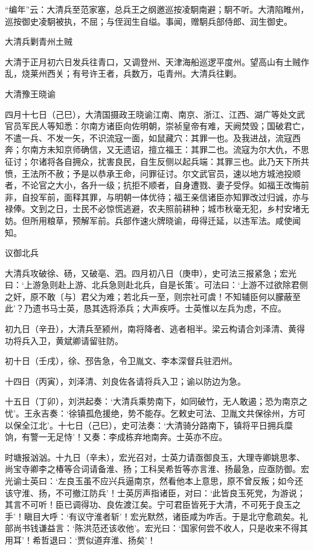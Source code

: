 \documentclass[]{article}
\begin{document}
``编年''云：大清兵至范家塞，总兵王之纲邀巡按凌駉南避；駉不听。大清陷睢州，巡按御史凌駉被执，不屈；与侄润生自缢。事闻，赠駉兵部侍郎、润生御史。

大清兵剿青州土贼

大清于正月初六日发兵往青口，又调登州、天津海船巡逻平度州。望高山有土贼作乱，烧莱州西关；有号许王者，兵数万，屯青州。大清兵往剿。

大清豫王晓谕

四月十七日（己巳），大清国摄政王晓谕江南、南京、浙江、江西、湖广等处文武官员军民人等知悉：尔南方诸臣向佐明朝，崇祯皇帝有难，天阙焚毁；国破君亡，不遣一兵、不发一矢，不识流寇一面，如鼠藏穴：其罪一也。及我进战，流寇西奔；尔南方未知京师确信，又无遗诏，擅立福王：其罪二也。流寇为尔大仇，不思征讨；尔诸将各自拥众，扰害良民，自生反侧以起兵端：其罪三也。此乃天下所共愤，王法所不赦；予是以恭承王命，问罪征讨。尔文武官员，速以地方城池投顺者，不论官之大小，各升一级；抗拒不顺者，自身遭戮、妻子受俘。如福王改悔前非，自投军前，面释其罪，与明朝一体优待；福王亲信诸臣亦知罪改过归诚，亦与禄俸。文到之日，士民不必惊慌逃避，农夫照前耕种；城市秋毫无犯，乡村安堵无妨。但所用粮草，预解军前。兵部作速火牌晓谕，毋得迁延，以违军法。咸使闻知。

议御北兵

大清兵攻破徐、砀，又破亳、泗。四月初八日（庚申），史可法三报紧急；宏光曰：`上游急则赴上游、北兵急则赴北兵，自是长策'。可法曰：`上游不过欲除君侧之奸，原不敢〔与〕君父为难；若北兵一至，则宗社可虞！不知辅臣何以朦蔽至此'？乃遗书马士英，恳其选将添兵；大声疾呼。士英惟以左兵为虑，不应。

初九日（辛丑），大清兵至颍州，南将降者、逃者相半。梁云构请合刘泽清、黄得功将兵入卫，黄斌卿请留驻防。

初十日（壬戌），徐、邳告急，令卫胤文、李本深督兵驻泗州。

十四日（丙寅），刘泽清、刘良佐各请将兵入卫；谕以防边为急。

十五日（丁卯），刘洪起奏：`大清兵乘势南下，如同破竹，无人敢遏；恐为南京之忧'。王永吉奏：`徐镇孤危援绝，势不能存。乞敕史可法、卫胤文共保徐州，方可以保全江北'。十七日（己巳），史可法奏：`大清骑分路南下，镇将平日拥兵糜饷，有警一无足恃'！又奏：李成栋弃地南奔。士英亦不应。

时塘报汹汹。十九日（辛未），宏光召对，士英力请亟御良玉，大理寺卿姚思孝、尚宝寺卿李之椿等合词请备淮、扬；工科吴希哲等亦言淮、扬最急，应亟防御。宏光谕士英曰：`左良玉虽不应兴兵逼南京，然看他本上意思，原不曾反叛；如今还该守淮、扬，不可撤江防兵'！士英厉声指诸臣，对曰：`此皆良玉死党，为游说；其言不可听！臣已调得功、良佐渡江矣。宁可君臣皆死于大清，不可死于良玉之手'！瞋目大呼：`有议守淮者斩'！宏光默然，诸臣咸为咋舌。于是北守愈疏矣。礼部尚书钱谦益言：`陈洪范还该收他'。宏光曰：`国家何尝不收人，只是收来不得其用耳'！希哲退曰：`贾似道弃淮、扬矣'！
\end{document}
